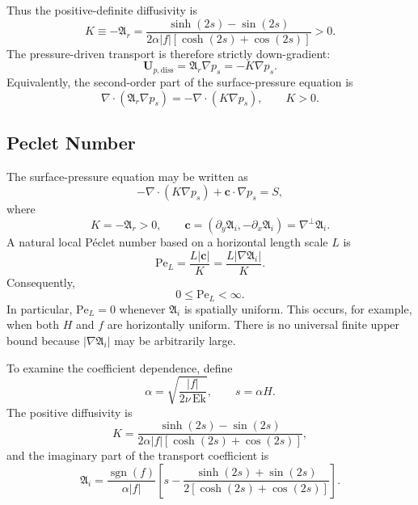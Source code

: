 \documentclass[10pt]{amsart}
\begin{document}
Thus the positive-definite diffusivity is
\begin{equation}
K\equiv-\mathfrak A_r
=
\frac{\sinh(2s)-\sin(2s)}
{
2\alpha |f|
\left[\cosh(2s)+\cos(2s)\right]
}>0.
\end{equation}
The pressure-driven transport is therefore strictly down-gradient:
\begin{equation}
\boldsymbol U_{p,\mathrm{diss}}
=
\mathfrak A_r\nabla p_s
=
-K\nabla p_s.
\end{equation}
Equivalently, the second-order part of the surface-pressure equation is
\begin{equation}
\nabla\cdot\left(\mathfrak A_r\nabla p_s\right)
=
-\nabla\cdot\left(K\nabla p_s\right),
\qquad K>0.
\end{equation}

\subsection{Peclet Number}


The surface-pressure equation may be written as
\begin{equation}
-\nabla\cdot\left(K\nabla p_s\right)
+\boldsymbol{c}\cdot\nabla p_s
=S,
\end{equation}
where
\begin{equation}
K=-\mathfrak A_r>0,
\qquad
\boldsymbol{c}
=
\left(\partial_y\mathfrak A_i,-\partial_x\mathfrak A_i\right)
=
\nabla^\perp\mathfrak A_i.
\end{equation}
A natural local P\'eclet number based on a horizontal length scale \(L\) is
\begin{equation}
\boxed{
\mathrm{Pe}_L
=
\frac{L\lvert\boldsymbol{c}\rvert}{K}
=
\frac{L\lvert\nabla\mathfrak A_i\rvert}{K}
}.
\end{equation}
Consequently,
\begin{equation}
\boxed{0\leq \mathrm{Pe}_L<\infty}.
\end{equation}
In particular, \(\mathrm{Pe}_L=0\) whenever \(\mathfrak A_i\) is spatially
uniform. This occurs, for example, when both \(H\) and \(f\) are horizontally
uniform. There is no universal finite upper bound because
\(\lvert\nabla\mathfrak A_i\rvert\) may be arbitrarily large.

To examine the coefficient dependence, define
\begin{equation}
\alpha
=
\sqrt{\frac{|f|}{2\nu\,\mathrm{Ek}}},
\qquad
s=\alpha H.
\end{equation}
The positive diffusivity is
\begin{equation}
K
=
\frac{\sinh(2s)-\sin(2s)}
{
2\alpha |f|
\left[\cosh(2s)+\cos(2s)\right]
},
\end{equation}
and the imaginary part of the transport coefficient is
\begin{equation}
\mathfrak A_i
=
\frac{\operatorname{sgn}(f)}{\alpha |f|}
\left[
s
-
\frac{\sinh(2s)+\sin(2s)}
{
2\left[\cosh(2s)+\cos(2s)\right]
}
\right].
\end{equation}
\end{document}
